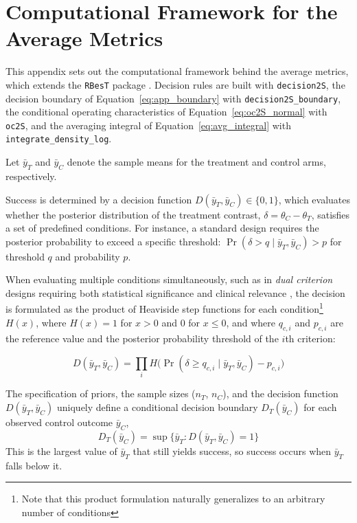 \chapter{Computational Framework for the Average Metrics}
\label{app:computational_framework}

This appendix sets out the computational framework behind the average metrics, which extends the \texttt{RBesT} package \citep{weber_applying_2021}. Decision rules are built with \texttt{decision2S}, the decision boundary of Equation~\eqref{eq:app_boundary} with \texttt{decision2S\_boundary}, the conditional operating characteristics of Equation~\eqref{eq:oc2S_normal} with \texttt{oc2S}, and the averaging integral of Equation~\eqref{eq:avg_integral} with \texttt{integrate\_density\_log}.

Let $\bar{y}_T$ and $\bar{y}_C$ denote the sample means for the treatment and control arms, respectively.

Success is determined by a decision function $D(\bar{y}_T, \bar{y}_C) \in \{0, 1\}$, which evaluates whether the posterior distribution of the treatment contrast, 
  $\delta = \theta_C - \theta_T$, satisfies a set of predefined conditions. For instance, a standard design requires the posterior probability to 
  exceed a specific threshold: $\Pr(\delta > q \mid \bar{y}_T, \bar{y}_C) > p$ for threshold $q$ and probability $p$.

When evaluating multiple conditions simultaneously, such as in \textit{dual criterion} designs requiring both statistical significance and clinical relevance 
\citep{roychoudhury_beyond_2018}, the decision is formulated as the product of Heaviside step functions for each condition\footnote{Note that this product 
formulation naturally generalizes to an arbitrary number of conditions} $H(x)$, where $H(x) = 1$ for $x > 0$ and $0$ for $x \le 0$, and where $q_{c,i}$ and $p_{c,i}$ are the reference value and the posterior probability threshold of the $i$th criterion:

$$D(\bar{y}_T, \bar{y}_C) = \prod_{i} H\Big(\Pr(\delta \ge q_{c,i} \mid \bar{y}_T, \bar{y}_C) - p_{c,i}\Big)$$



The specification of priors, the sample sizes ($n_T$, $n_C$), and the decision function $D(\bar{y}_T, \bar{y}_C)$ uniquely define a conditional decision boundary 
$D_T(\bar{y}_C)$ for each observed control outcome $\bar{y}_C$,
\begin{equation} \label{eq:app_boundary}
D_T(\bar{y}_C) = \sup\{\bar{y}_T : D(\bar{y}_T, \bar{y}_C) = 1\}
\end{equation}
This is the largest value of $\bar{y}_T$ that still yields success, so success occurs when $\bar{y}_T$ falls below it.

